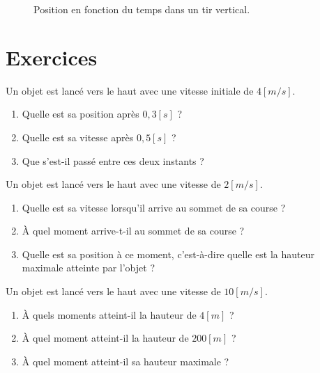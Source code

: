 \begin{figure}[!ht]
  \centering
  
  \caption{Position en fonction du temps dans un tir vertical.}
  \label{position_tir_vertical}
\end{figure}

\newpage

\section{Exercices}
\begin{exercise}
  Un objet est lancé vers le haut avec une vitesse initiale de \(4\unit{[m/s]}\).
  \begin{enumerate}[label=\alph*)]
    \item Quelle est sa position après \(0,3\unit{[s]}\) ?
    \item Quelle est sa vitesse après \(0,5\unit{[s]}\) ?
    \item Que s'est-il passé entre ces deux instants ?
  \end{enumerate}
\end{exercise}

\begin{exercise}
  Un objet est lancé vers le haut avec une vitesse de \(2\unit{[m/s]}\).
  \begin{enumerate}[label=\alph*)]
    \item Quelle est sa vitesse lorsqu'il arrive au sommet de sa course ?
    \item À quel moment arrive-t-il au sommet de sa course ?
    \item Quelle est sa position à ce moment, c'est-à-dire quelle est la hauteur maximale atteinte par l'objet ?
  \end{enumerate}
\end{exercise}

\begin{exercise}
  Un objet est lancé vers le haut avec une vitesse de \(10 \unit{[m/s]}\).
  \begin{enumerate}[label=\alph*)]
    \item À quels moments atteint-il la hauteur de \(4\unit{[m]}\) ?
    \item À quel moment atteint-il la hauteur de \(200\unit{[m]}\) ?
    \item À quel moment atteint-il sa hauteur maximale ?
  \end{enumerate}
\end{exercise}

